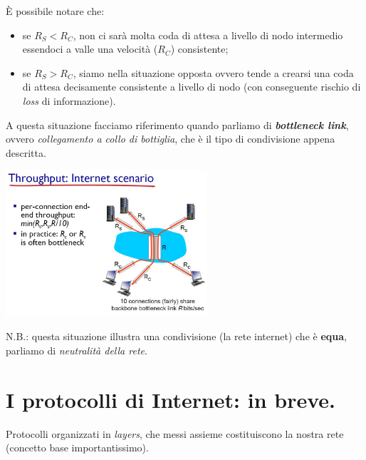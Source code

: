 \documentclass[10pt, a4paper, openany]{book}
\begin{document}
\noindent È possibile notare che:
\begin{itemize}
    \item se $R_S < R_C$, non ci sarà molta coda di attesa a livello di nodo intermedio essendoci a valle una velocità ($R_C$) consistente;
    \item se $R_S > R_C$, siamo nella situazione opposta ovvero tende a crearsi una coda di attesa decisamente consistente a livello di nodo (con conseguente rischio di \textit{loss} di informazione).
\end{itemize}
\noindent A questa situazione facciamo riferimento quando parliamo di \textit{\textbf{bottleneck link}}, ovvero \textit{collegamento a collo di bottiglia}, che è il tipo di condivisione appena descritta.
\begin{center}
    \includegraphics[width=75mm]{cap1 - Introduzione alle reti - 31.jpg}
\end{center}
\noindent N.B.: questa situazione illustra una condivisione (la rete internet) che è \textbf{equa}, parliamo di \textit{neutralità della rete}.

\section{I protocolli di Internet: in breve.}
\noindent Protocolli organizzati in \textit{layers}, che messi assieme costituiscono la nostra rete (concetto base importantissimo).
\end{document}
